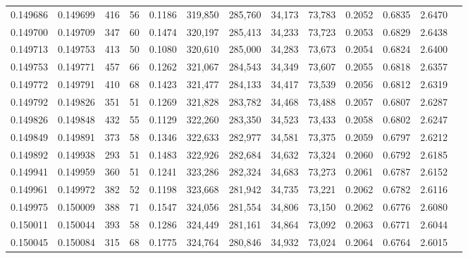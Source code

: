 \begin{tabular}{rrrrrrrrrrrrr}
0.149686 & 0.149699 &   416 &  56 &                                     0.1186 & 319,850 & 285,760 &  34,173 &  73,783 & 0.2052 & 0.6835 & 2.6470 \\
0.149700 & 0.149709 &   347 &  60 &                                     0.1474 & 320,197 & 285,413 &  34,233 &  73,723 & 0.2053 & 0.6829 & 2.6438 \\
0.149713 & 0.149753 &   413 &  50 &                                     0.1080 & 320,610 & 285,000 &  34,283 &  73,673 & 0.2054 & 0.6824 & 2.6400 \\
0.149753 & 0.149771 &   457 &  66 &                                     0.1262 & 321,067 & 284,543 &  34,349 &  73,607 & 0.2055 & 0.6818 & 2.6357 \\
0.149772 & 0.149791 &   410 &  68 &                                     0.1423 & 321,477 & 284,133 &  34,417 &  73,539 & 0.2056 & 0.6812 & 2.6319 \\
0.149792 & 0.149826 &   351 &  51 &                                     0.1269 & 321,828 & 283,782 &  34,468 &  73,488 & 0.2057 & 0.6807 & 2.6287 \\
0.149826 & 0.149848 &   432 &  55 &                                     0.1129 & 322,260 & 283,350 &  34,523 &  73,433 & 0.2058 & 0.6802 & 2.6247 \\
0.149849 & 0.149891 &   373 &  58 &                                     0.1346 & 322,633 & 282,977 &  34,581 &  73,375 & 0.2059 & 0.6797 & 2.6212 \\
0.149892 & 0.149938 &   293 &  51 &                                     0.1483 & 322,926 & 282,684 &  34,632 &  73,324 & 0.2060 & 0.6792 & 2.6185 \\
0.149941 & 0.149959 &   360 &  51 &                                     0.1241 & 323,286 & 282,324 &  34,683 &  73,273 & 0.2061 & 0.6787 & 2.6152 \\
0.149961 & 0.149972 &   382 &  52 &                                     0.1198 & 323,668 & 281,942 &  34,735 &  73,221 & 0.2062 & 0.6782 & 2.6116 \\
0.149975 & 0.150009 &   388 &  71 &                                     0.1547 & 324,056 & 281,554 &  34,806 &  73,150 & 0.2062 & 0.6776 & 2.6080 \\
0.150011 & 0.150044 &   393 &  58 &                                     0.1286 & 324,449 & 281,161 &  34,864 &  73,092 & 0.2063 & 0.6771 & 2.6044 \\
0.150045 & 0.150084 &   315 &  68 &                                     0.1775 & 324,764 & 280,846 &  34,932 &  73,024 & 0.2064 & 0.6764 & 2.6015 \\

\end{tabular}
